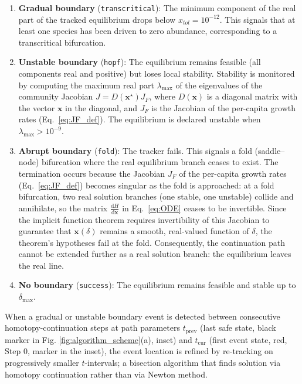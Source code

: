 \documentclass[pdflatex,sn-mathphys-num]{sn-jnl}%
\begin{document}
\begin{enumerate}
 \item \textbf{Gradual boundary} (\texttt{transcritical}): The minimum component of the real part of the tracked equilibrium drops below $x_{tol} = 10^{-12}$. This signals that at least one species has been driven to zero abundance, corresponding to a transcritical bifurcation.

 \item \textbf{Unstable boundary} (\texttt{hopf}): The equilibrium remains feasible (all components real and positive) but loses local stability. Stability is monitored by computing the maximum real part $\lambda_{\max}$ of the eigenvalues of the community Jacobian $J = D(\mathbf{x}^\star) J_F$, where $D(\mathbf{x})$ is a diagonal matrix with the vector $\mathbf{x}$ in the diagonal, and $J_F$ is the Jacobian of the per-capita growth rates (Eq.~\ref{eq:JF_def}). The equilibrium is declared unstable when $\lambda_{\max}>10^{-9}$.
 
 \item \textbf{Abrupt boundary} (\texttt{fold}): The tracker fails. This signals a fold (saddle--node) bifurcation where the real equilibrium branch ceases to exist. The termination occurs because the Jacobian $J_F$ of the per-capita growth rates (Eq.~\ref{eq:JF_def}) becomes singular as the fold is approached: at a fold bifurcation, two real solution branches (one stable, one unstable) collide and annihilate, so the matrix $\frac{\mathrm{d}H}{\mathrm{d}\mathbf{x}}$ in Eq.~\ref{eq:ODE} ceases to be invertible. Since the implicit function theorem requires invertibility of this Jacobian to guarantee that $\mathbf{x}(\delta)$ remains a smooth, real-valued function of $\delta$, the theorem's hypotheses fail at the fold. Consequently, the continuation path cannot be extended further as a real solution branch: the equilibrium leaves the real line.
 
 \item \textbf{No boundary} (\texttt{success}): The equilibrium remains feasible and stable up to $\delta_{\max}$.

\end{enumerate} 

When a gradual or unstable boundary event is detected between consecutive homotopy-continuation steps at path parameters $t_{\mathrm{prev}}$ (last safe state, black marker in Fig. \ref{fig:algorithm_scheme}(a), inset) and $t_{\mathrm{cur}}$ (first event state, red, Step 0, marker in the inset), the event location is refined by re-tracking on progressively smaller $t$-intervals; a bisection algorithm that finds solution via homotopy continuation rather than via Newton method.
\end{document}
